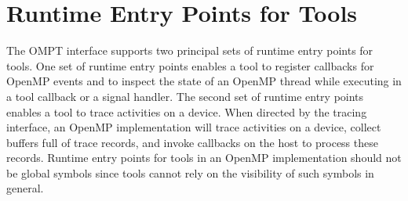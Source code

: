 %
%
%
%
%
%
%
%
%
%
%
%
%


\section{Runtime Entry Points for Tools}
\label{sec:entry-points}

The OMPT interface supports two principal sets of runtime entry points for tools. One
set of runtime entry points enables a tool to register callbacks for OpenMP
events and to inspect the state of an OpenMP thread while
executing in a tool callback or a signal handler. The second set of runtime entry points enables a
tool to trace activities on a device. When directed by the tracing
interface, an OpenMP implementation will trace activities on a device, collect
buffers full of trace records, and invoke callbacks on the host to
process these records.
Runtime entry points for tools in an OpenMP implementation
should not be global symbols since tools cannot rely on the visibility
of such symbols in general.

